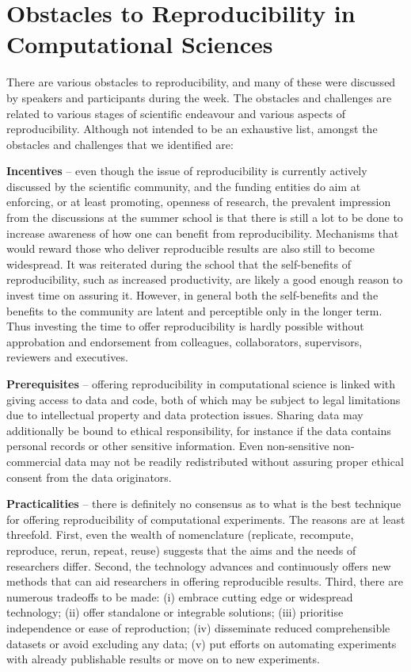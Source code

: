 \section{Obstacles to Reproducibility in Computational Sciences}
\label{s:obstacles}

There are various obstacles to reproducibility, and many of these were
  discussed by speakers and participants during the week. 
The obstacles and challenges are related to various stages of scientific 
  endeavour and various aspects of reproducibility.
Although not intended to be an exhaustive list, amongst the obstacles and 
  challenges that we identified are:

{\bf Incentives} -- even though the issue of reproducibility is
  currently actively discussed by the scientific community, 
  and the funding entities do aim at enforcing, or at least promoting,
  openness of research, the prevalent impression from the discussions at 
  the summer school is that there is still a lot to be done to increase 
  awareness of how one can benefit from reproducibility.
Mechanisms that would reward those who deliver reproducible results are also
  still to become widespread.
It was reiterated during the school that the self-benefits 
  of reproducibility, such as increased productivity, are likely 
  a good enough reason to invest time on assuring it.
However, in general both the self-benefits and the benefits to the community
  are latent and perceptible only in the longer term.
Thus investing the time to offer reproducibility is hardly possible without
  approbation and endorsement from colleagues, collaborators, supervisors,
  reviewers and executives.
  
{\bf Prerequisites} -- offering reproducibility in computational
  science is linked with giving access to data and code, both of which may
  be subject to legal limitations due to intellectual property and
  data protection issues.
Sharing data may additionally be bound to ethical responsibility, for instance
  if the data contains personal records or other sensitive information.  
Even non-sensitive non-commercial data may not be readily redistributed
  without assuring proper ethical consent from the data originators.

{\bf Practicalities} -- there is definitely no consensus as to what is the
  best technique for offering reproducibility of computational experiments. 
The reasons are at least threefold. 
First, even the wealth of nomenclature (replicate, recompute, reproduce, 
  rerun, repeat, reuse) suggests that the aims and the needs of researchers
  differ.
Second, the technology advances and continuously offers new methods that can
  aid researchers in offering reproducible results.
Third, there are numerous tradeoffs to be made: 
  (i) embrace cutting edge or widespread technology; 
  (ii) offer standalone or integrable solutions; 
  (iii) prioritise independence or ease of reproduction; 
  (iv) disseminate reduced comprehensible datasets or avoid excluding any data;
  (v) put efforts on automating experiments with already publishable results or
    move on to new experiments.
    
